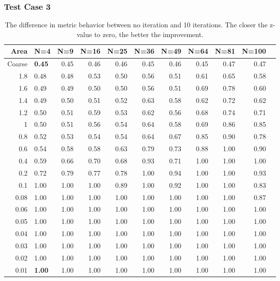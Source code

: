 \documentclass[]{beamer}
\begin{document}
\begin{frame}[t]\frametitle{Test Case 3}
\begin{table}[H]
\centering
\tiny
\caption{The difference in metric behavior between no iteration and 10 iterations. The closer the z-value to zero, the better the improvement.} 
\begin{tabular}{rlrrrrrrrrr}
  \hline
  Area & N=4 & N=9 & N=16 & N=25 & N=36 & N=49 & N=64 & N=81 & N=100 \\ 
  \hline
Coarse & \textbf{\cellcolor{blue!25}0.45} & 0.45 & 0.46 & 0.46 & 0.45 & 0.46 & 0.45 & 0.47 & 0.47 \\ 
  1.8 & 0.48 & 0.48 & 0.53 & 0.50 & 0.56 & 0.51 & 0.61 & 0.65 & 0.58 \\ 
 1.6 & 0.49 & 0.49 & 0.50 & 0.50 & 0.56 & 0.51 & 0.69 & 0.78 & 0.60 \\ 
 1.4 & 0.49 & 0.50 & 0.51 & 0.52 & 0.63 & 0.58 & 0.62 & 0.72 & 0.62 \\ 
 1.2 & 0.50 & 0.51 & 0.59 & 0.53 & 0.62 & 0.56 & 0.68 & 0.74 & 0.71 \\ 
1 & 0.50 & 0.51 & 0.56 & 0.54 & 0.64 & 0.58 & 0.69 & 0.86 & 0.85 \\ 
 0.8 & 0.52 & 0.53 & 0.54 & 0.54 & 0.64 & 0.67 & 0.85 & 0.90 & 0.78 \\ 
 0.6 & 0.54 & 0.58 & 0.58 & 0.63 & 0.79 & 0.73 & 0.88 & 1.00 & 0.90 \\ 
 0.4 & 0.59 & 0.66 & 0.70 & 0.68 & 0.93 & 0.71 & 1.00 & 1.00 & 1.00 \\ 
   0.2 & 0.72 & 0.79 & 0.77 & 0.78 & 1.00 & 0.94 & 1.00 & 1.00 & 0.93 \\ 
 0.1 & 1.00 & 1.00 & 1.00 & 0.89 & 1.00 & 0.92 & 1.00 & 1.00 & 0.83 \\ 
 0.08 & 1.00 & 1.00 & 1.00 & 1.00 & 1.00 & 1.00 & 1.00 & 1.00 & 0.87 \\ 
 0.06 & 1.00 & 1.00 & 1.00 & 1.00 & 1.00 & 1.00 & 1.00 & 1.00 & 1.00 \\ 
 0.05 & 1.00 & 1.00 & 1.00 & 1.00 & 1.00 & 1.00 & 1.00 & 1.00 & 1.00 \\ 
0.04 & 1.00 & 1.00 & 1.00 & 1.00 & 1.00 & 1.00 & 1.00 & 1.00 & 1.00 \\ 
  0.03 & 1.00 & 1.00 & 1.00 & 1.00 & 1.00 & 1.00 & 1.00 & 1.00 & 1.00 \\ 
  0.02 & 1.00 & 1.00 & 1.00 & 1.00 & 1.00 & 1.00 & 1.00 & 1.00 & 1.00 \\ 
  0.01 & \textbf{\cellcolor{blue!25}1.00} & 1.00 & 1.00 & 1.00 & 1.00 & 1.00 & 1.00 & 1.00 & 1.00 \\ 
   \hline
\end{tabular}
\end{table}
\end{frame}
\end{document}
